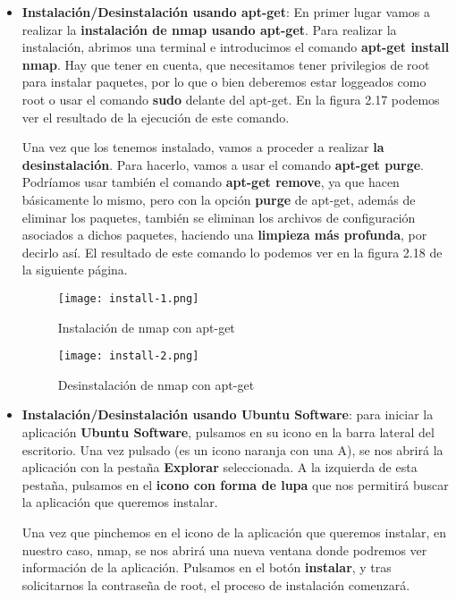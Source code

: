 \begin{itemize}
    \item \textbf{Instalación/Desinstalación usando apt-get}: En primer lugar vamos a realizar la \textbf{instalación de nmap usando apt-get}. Para realizar la instalación, abrimos una terminal e introducimos el comando \textbf{apt-get install nmap}. Hay que tener en cuenta, que necesitamos tener privilegios de root para instalar paquetes, por lo que o bien deberemos estar loggeados como root o usar el comando \textbf{sudo} delante del apt-get. En la figura 2.17 podemos ver el resultado de la ejecución de este comando.

    Una vez que los tenemos instalado, vamos a proceder a realizar \textbf{la desinstalación}. Para hacerlo, vamos a usar el comando \textbf{apt-get purge}. Podríamos usar también el comando \textbf{apt-get remove}, ya que hacen básicamente lo mismo, pero con la opción \textbf{purge} de apt-get, además de eliminar los paquetes, también se eliminan los archivos de configuración asociados a dichos paquetes, haciendo una \textbf{limpieza más profunda}, por decirlo así.
    El resultado de este comando lo podemos ver en la figura 2.18 de la siguiente página.


\begin{figure}[H]
    \centering
    \texttt{[image: install-1.png]}
    \caption{Instalación de nmap con apt-get}
\end{figure}

\begin{figure}[H]
    \centering
    \texttt{[image: install-2.png]}
    \caption{Desinstalación de nmap con apt-get}
\end{figure}

    \item \textbf{Instalación/Desinstalación usando Ubuntu Software}: para iniciar la aplicación \textbf{Ubuntu Software}, pulsamos en su icono en la barra lateral del escritorio. Una vez pulsado (es un icono naranja con una A), se nos abrirá la aplicación con la pestaña \textbf{Explorar} seleccionada. A la izquierda de esta pestaña, pulsamos en el \textbf{icono con forma de lupa} que nos permitirá buscar la aplicación que queremos instalar.

    Una vez que pinchemos en el icono de la aplicación que queremos instalar, en nuestro caso, nmap, se nos abrirá una nueva ventana donde podremos ver información de la aplicación. Pulsamos en el botón \textbf{instalar}, y tras solicitarnos la contraseña de root, el proceso de instalación comenzará.


\end{itemize}
